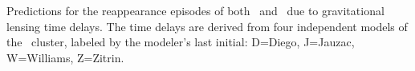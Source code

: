 Predictions for the reappearance episodes of both \spockone\ and \spocktwo\, due to gravitational lensing time delays.  The time delays are derived from four independent models of the \ cluster, labeled by the modeler's last initial: D=Diego, J=Jauzac, W=Williams, Z=Zitrin. 
  